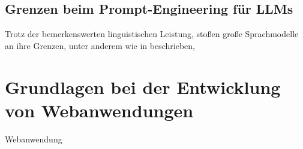 








\subsection{Grenzen beim Prompt-Engineering für LLMs}
Trotz der bemerkenswerten linguistischen Leistung, stoßen große Sprachmodelle an ihre Grenzen, unter anderem wie in \cite{amatriain-2024} beschrieben,




\section{Grundlagen bei der Entwicklung von Webanwendungen}
Webanwendung
